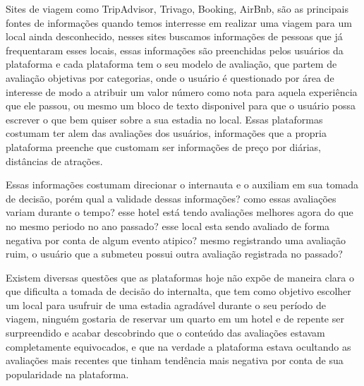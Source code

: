 Sites de viagem como TripAdvisor, Trivago, Booking, AirBnb, são as principais fontes de informações quando temos interresse em realizar uma viagem para um local ainda desconhecido, nesses sites buscamos informações de pessoas que já frequentaram esses locais, essas informações são preenchidas pelos usuários da plataforma e cada plataforma tem o seu modelo de avaliação, que partem de avaliação objetivas por categorias, onde o usuário é questionado por área de interesse de modo a atribuir um valor número como nota para aquela experiência que ele passou, ou mesmo um bloco de texto disponivel para que o usuário possa escrever o que bem quiser sobre a sua estadia no local. Essas plataformas costumam ter alem das avaliações dos usuários, informações que a propria plataforma preenche que customam ser informações de preço por diárias, distâncias de atrações.

Essas informações costumam direcionar o internauta e o auxiliam em sua tomada de decisão, porém qual a validade dessas informações? como essas avaliações variam durante o tempo? esse hotel está tendo avaliações melhores agora do que no mesmo periodo no ano passado? esse local esta sendo avaliado de forma negativa por conta de algum evento atipico? mesmo registrando uma avaliação ruim, o usuário que a submeteu possui outra avaliação registrada no passado? 

Existem diversas questões que as plataformas hoje não expõe de maneira clara o que dificulta a tomada de decisão do internalta, que tem como objetivo escolher um local para usufruir de uma estadia agradável durante o seu período de viagem, ninguém gostaria de reservar um quarto em um hotel e de repente ser surpreendido e acabar descobrindo que o conteúdo das avaliações estavam completamente equivocados, e que na verdade a plataforma estava ocultando as avaliações mais recentes que tinham tendência mais negativa por conta de sua popularidade na plataforma.

\begin{comment}
O presente relatório está estruturado da seguinte forma: o capítulo~\ref{cap:justificativa} apresenta..., o capítulo~\ref{cap:fund_teorica}... O capítulo~\ref{cap:metodologia} ..., o capítulo~\ref{cap:resultados} .... O capítulo~\ref{cap:conclusao} 

Demonstração de citação: o software de análise foi desenvolvido na linguagem Python~\cite{van1995python}, usando as bibliotecas Pandas~\cite{mckinney2010data} e Scikit-learn~\cite{scikit-learn}.
\end{comment}

